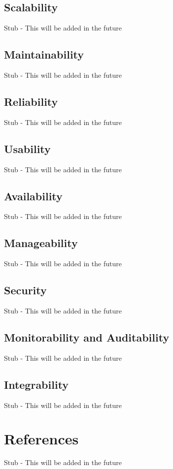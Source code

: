 \documentclass[12pt]{article}
\begin{document}
\subsection{Scalability}
Stub - This will be added in the future
\subsection{Maintainability}
Stub - This will be added in the future
\subsection{Reliability}
Stub - This will be added in the future
\subsection{Usability}
Stub - This will be added in the future
\subsection{Availability}
Stub - This will be added in the future
\subsection{Manageability}
Stub - This will be added in the future
\subsection{Security}
Stub - This will be added in the future
\subsection{Monitorability and Auditability}
Stub - This will be added in the future
\subsection{Integrability}
Stub - This will be added in the future

\section{References}
Stub - This will be added in the future
\end{document}
